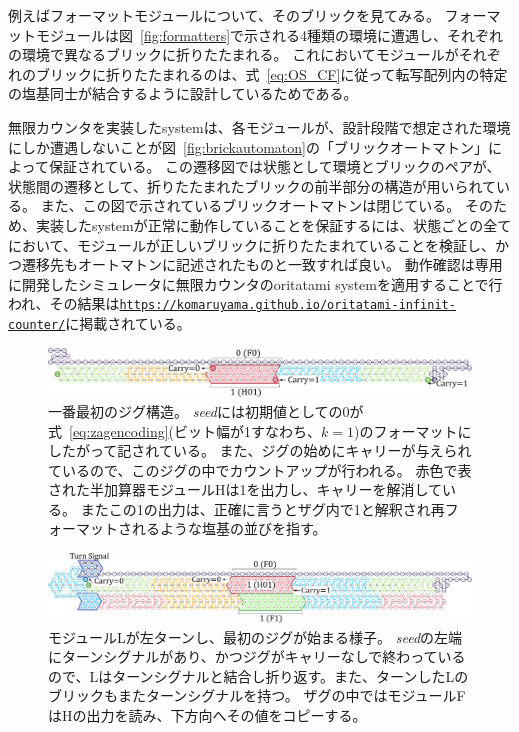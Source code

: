 \documentclass[a4,11pt]{article}
\begin{document}
例えばフォーマットモジュールについて、そのブリックを見てみる。
フォーマットモジュールは図~\ref{fig:formatters}で示される4種類の環境に遭遇し、それぞれの環境で異なるブリックに折りたたまれる。
これにおいてモジュールがそれぞれのブリックに折りたたまれるのは、式~\eqref{eq:OS_CF}に従って転写配列内の特定の塩基同士が結合するように設計しているためである。

無限カウンタを実装したsystemは、各モジュールが、設計段階で想定された環境にしか遭遇しないことが図~\ref{fig:brickautomaton}の「ブリックオートマトン」によって保証されている。
この遷移図では状態として環境とブリックのペアが、状態間の遷移として、折りたたまれたブリックの前半部分の構造が用いられている。
また、この図で示されているブリックオートマトンは閉じている。
そのため、実装したsystemが正常に動作していることを保証するには、状態ごとの全てにおいて、モジュールが正しいブリックに折りたたまれていることを検証し、かつ遷移先もオートマトンに記述されたものと一致すれば良い。
動作確認は専用に開発したシミュレータに無限カウンタのoritatami systemを適用することで行われ、その結果は\href{https://komaruyama.github.io/oritatami-infinit-counter/}{\texttt{https://komaruyama.github.io/oritatami-infinit-counter/}}に掲載されている。

\newpage
%
%
%
\begin{figure}[h]
\centering
\includegraphics[width=\linewidth]{fig/svg/CounterEx5_1.pdf}
\caption{
一番最初のジグ構造。
\textit{seed}には初期値としての0が式~\eqref{eq:zagencoding}(ビット幅が1すなわち、$k=1$)のフォーマットにしたがって記されている。
また、ジグの始めにキャリーが与えられているので、このジグの中でカウントアップが行われる。
赤色で表された半加算器モジュールHは1を出力し、キャリーを解消している。
またこの1の出力は、正確に言うとザグ内で1と解釈され再フォーマットされるような塩基の並びを指す。
}

\label{fig:counter1stzig}
\end{figure}

\begin{figure}[h]
\centering
\includegraphics[width=\linewidth]{fig/svg/CounterEx11_1.pdf}
\caption{
モジュールLが左ターンし、最初のジグが始まる様子。
\textit{seed}の左端にターンシグナルがあり、かつジグがキャリーなしで終わっているので、Lはターンシグナルと結合し折り返す。また、ターンしたLのブリックもまたターンシグナルを持つ。
ザグの中ではモジュールFはHの出力を読み、下方向へその値をコピーする。
}
\label{fig:counter1stzag}
\end{figure}
\end{document}
